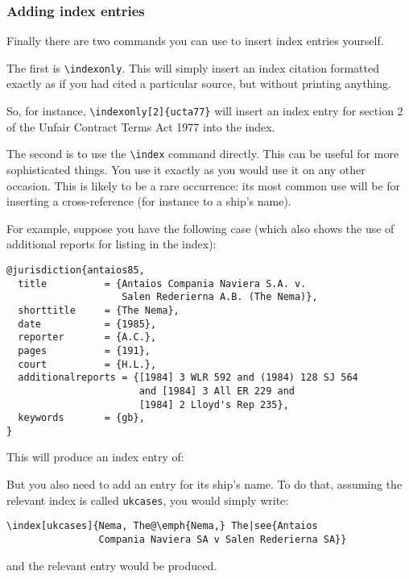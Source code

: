 \documentclass[a4paper,
               11pt,
	       DIV=1,			   
	       footinclude=false]
	      {scrartcl}
\newcounter{egcounter}\setcounter{egcounter}{0}
\newlength{\boxwidth}
\newenvironment{bibexample}[1][]
{%
  \medskip\par\noindent\ignorespaces
  \marginpar{[\refstepcounter{egcounter}\arabic{egcounter}]\label{#1}}%
  \setlength{\boxwidth}{0.95\linewidth}%
  \addtolength{\boxwidth}{-2\fboxsep}
  \addtolength{\boxwidth}{-2\fboxrule}
  \begin{lrbox}{\boxcontainer}
  \begin{minipage}[t]{\boxwidth}%
}
{%
  \end{minipage}\end{lrbox}%
  \colorbox{gray!30}{\usebox{\boxcontainer}}
  \par\medskip}
\begin{document}
\subsubsection{Adding index entries\label{trickyindexing}}

Finally there are two commands you can use to insert index entries yourself.

The first is \verb|\indexonly|. This will simply insert an index
citation formatted exactly as if you had cited a particular source,
but without printing anything.

So, for instance, \verb|\indexonly[2]{ucta77}| will insert an index
entry for section 2 of the Unfair Contract Terms Act 1977 into the
index.

The second is to use the \verb|\index| command directly. This can be
useful for more sophisticated things. You use it exactly as you would
use it on any other occasion. This is likely to be a rare occurrence:
its most common use will be for inserting a cross-reference (for
instance to a ship's name).

For example, suppose you have the following case (which also
shows the use of additional reports for listing in the index):
\begin{bibexample}[antaios85]
\begin{verbatim}
@jurisdiction{antaios85,
  title          = {Antaios Compania Naviera S.A. v. 
                    Salen Rederierna A.B. (The Nema)},
  shorttitle     = {The Nema},
  date           = {1985},
  reporter       = {A.C.},
  pages          = {191},
  court          = {H.L.},
  additionalreports = {[1984] 3 WLR 592 and (1984) 128 SJ 564 
                       and [1984] 3 All ER 229 and 
                       [1984] 2 Lloyd's Rep 235},
  keywords       = {gb},
}
\end{verbatim}
\end{bibexample}

This will produce an index entry of:
\begin{quote}
\end{quote}\label{index:format}

But you also need to add an entry for its ship's name. To do that, assuming the relevant index is called \texttt{ukcases}, you would simply write:
\begin{verbatim}
\index[ukcases]{Nema, The@\emph{Nema,} The|see{Antaios 
                Compania Naviera SA v Salen Rederierna SA}}
\end{verbatim}
and the relevant entry would be produced.
\end{document}
